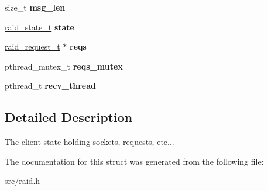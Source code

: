 \begin{DoxyCompactItemize}
\item 
size\+\_\+t {\bfseries msg\+\_\+len}\hypertarget{structraid__client_a2a567ea6c7b209e06cd79463d134a930}{}\label{structraid__client_a2a567ea6c7b209e06cd79463d134a930}

\item 
\hyperlink{raid_8h_a8a814d10ff9eabbde9329f6ace017c96}{raid\+\_\+state\+\_\+t} {\bfseries state}\hypertarget{structraid__client_a02ebab2de38a65783bf8e369776c02a2}{}\label{structraid__client_a02ebab2de38a65783bf8e369776c02a2}

\item 
\hyperlink{raid_8h_a640ed237b27f996b25b1f86b53426783}{raid\+\_\+request\+\_\+t} $\ast$ {\bfseries reqs}\hypertarget{structraid__client_ac297224801dc9a5ad28cb3778fbe253f}{}\label{structraid__client_ac297224801dc9a5ad28cb3778fbe253f}

\item 
pthread\+\_\+mutex\+\_\+t {\bfseries reqs\+\_\+mutex}\hypertarget{structraid__client_a9deb386c55875370eaeb1727782190d1}{}\label{structraid__client_a9deb386c55875370eaeb1727782190d1}

\item 
pthread\+\_\+t {\bfseries recv\+\_\+thread}\hypertarget{structraid__client_ad081567e05dc6b429a2fc8d88b138957}{}\label{structraid__client_ad081567e05dc6b429a2fc8d88b138957}

\end{DoxyCompactItemize}


\subsection{Detailed Description}
The client state holding sockets, requests, etc... 

The documentation for this struct was generated from the following file\+:\begin{DoxyCompactItemize}
\item 
src/\hyperlink{raid_8h}{raid.\+h}\end{DoxyCompactItemize}
